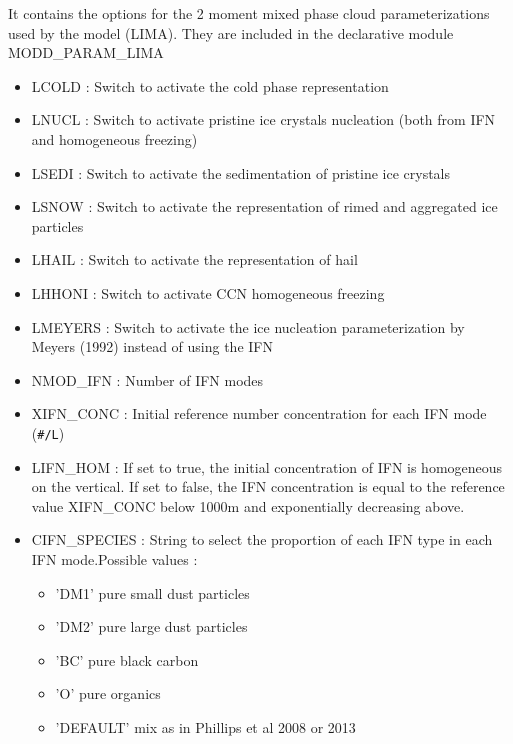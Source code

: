 It contains the options for the 2 moment mixed phase cloud parameterizations
used  by the model (LIMA). They are included in the declarative module
MODD\_PARAM\_LIMA
\begin{itemize}
\item
{}
LCOLD : Switch to activate the cold phase representation
\item
{}
LNUCL : Switch to activate pristine ice crystals nucleation (both from IFN and homogeneous freezing)
\item
{}
LSEDI : Switch to activate the sedimentation of pristine ice crystals
\item
{}
LSNOW : Switch to activate the representation of rimed and aggregated ice particles
\item
{}
LHAIL : Switch to activate the representation of hail
\item
{}
LHHONI : Switch to activate CCN homogeneous freezing
\item
{}
LMEYERS : Switch to activate the ice nucleation parameterization by Meyers (1992) instead of using the IFN
\item
{}
NMOD\_IFN : Number of IFN modes
\item
{}
XIFN\_CONC : Initial reference number concentration for each IFN mode (\verb?#/L?)
\item
{}
LIFN\_HOM : If set to true, the initial concentration of IFN is homogeneous on the vertical. If set to false, the IFN concentration is equal to the reference value XIFN\_CONC below 1000m and exponentially decreasing above.
\item
{}
CIFN\_SPECIES : String to select the proportion of each IFN type in each IFN mode.Possible values :
\begin{itemize}
\item 'DM1' pure small dust particles
\item 'DM2' pure large dust particles
\item 'BC'  pure black carbon
\item 'O'   pure organics
\item 'DEFAULT' mix as in Phillips et al 2008 or 2013
\end{itemize}

\end{itemize}
